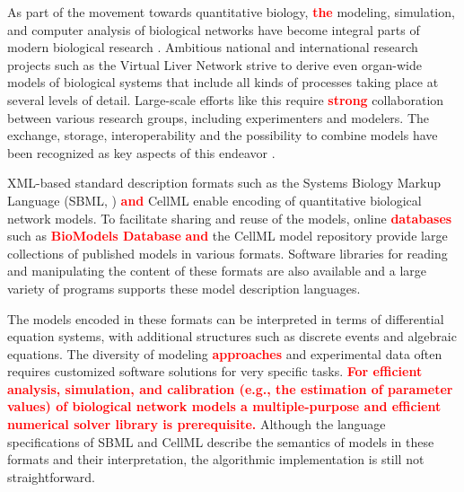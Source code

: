\documentclass[10pt]{bmc_article}
\newenvironment{bmcformat}{\baselineskip20pt\sloppy\setboolean{publ}{false}}{\baselineskip20pt\sloppy}
\newcommand{\TODO}[1]{\textcolor{red}{\textbf{#1}}}
\begin{document}
\begin{bmcformat}
As part of the movement towards quantitative biology, \TODO{the} modeling, 
simulation, and computer analysis of biological networks have become integral
parts of modern biological research \cite{Macilwain2011}.
Ambitious national and international research projects such as the Virtual Liver
Network \cite{Holzhuetter2012} strive to derive even organ-wide models of
biological systems that include all kinds of processes taking place at several
levels of detail.
Large-scale efforts like this require \TODO{strong} collaboration between various
research groups, including experimenters and modelers. The exchange, storage,
interoperability and the possibility to combine models have been recognized as
key aspects of this endeavor \cite{Liebermeister2009sta}.

XML-based standard description formats \cite{Bray2000} such as the Systems
Biology Markup Language (SBML, \cite{Hucka2004}) \TODO{and} CellML \cite{Lloyd2004}
enable encoding of quantitative biological network models.
To facilitate sharing and reuse of the models, online \TODO{databases} such as
\TODO{BioModels Database} \cite{Novere2006a} \TODO{and} the CellML model repository
\cite{Lloyd2008} provide large collections of published models in various
formats.
Software libraries for reading and manipulating the content
of these formats are also available \cite{Bornstein2008, Miller2010,
Draeger2011b} and a large variety of programs supports these model description
languages.

The models encoded in these formats can be interpreted in terms of differential
equation systems, with additional structures such as discrete events and
algebraic equations. 
The diversity of modeling \TODO{approaches} and experimental data often requires
customized software solutions for very specific tasks.
\TODO{For efficient analysis, simulation, and calibration (e.g.,
the estimation of parameter values) of biological network models a multiple-purpose and efficient numerical
solver library is prerequisite.}
Although the language specifications of SBML \cite{Hucka2001, Hucka2003,
Finney2003a, Finney2006, Hucka2007, Hucka2008, Hucka2010a} 
and CellML \cite{Cuellar2006} describe the semantics of models in these formats
and their interpretation, the algorithmic implementation is still not
straightforward.


\end{bmcformat}
\end{document}
